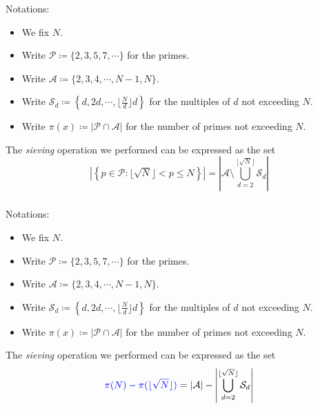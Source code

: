 \begin{frame}\frametitle{\insertsubsection}
Notations:
\begin{itemize}
  \item We fix \(N\).
  \item Write \(\mathcal{P} \coloneqq \{2, 3, 5, 7, \cdots\}\) for the primes.
  \item Write \(\mathcal{A} \coloneqq \{2, 3, 4, \cdots, N - 1, N\}\).
  \item Write \(\mathcal{S}_d \coloneqq \left\{d, 2d, \cdots, \lfloor\frac{N}{d}\rfloor d\right\}\) for the multiples of \(d\) not exceeding \(N\).
  \item Write {\color{blue} \(\pi(x) \coloneqq \left|\mathcal{P} \cap \mathcal{A}\right|\)} for the number of primes not exceeding \(N\).
\end{itemize}

The \textit{sieving} operation we performed can be expressed as the set
\[
  \left|\left\{ p \in \mathcal{P} : \lfloor\sqrt{N}\rfloor < p \leq N \right\}\right|
    = \left|\mathcal{A} \setminus \bigcup_{d = 2}^{\lfloor\sqrt{N}\rfloor} \mathcal{S}_d\right|
\]
\end{frame}

\begin{frame}\frametitle{\insertsubsection}
Notations:
\begin{itemize}
  \item We fix \(N\).
  \item Write \(\mathcal{P} \coloneqq \{2, 3, 5, 7, \cdots\}\) for the primes.
  \item Write \(\mathcal{A} \coloneqq \{2, 3, 4, \cdots, N - 1, N\}\).
  \item Write \(\mathcal{S}_d \coloneqq \left\{d, 2d, \cdots, \lfloor\frac{N}{d}\rfloor d\right\}\) for the multiples of \(d\) not exceeding \(N\).
  \item Write \(\pi(x) \coloneqq \left|\mathcal{P} \cap \mathcal{A}\right|\) for the number of primes not exceeding \(N\).
\end{itemize}

The \textit{sieving} operation we performed can be expressed as the set
\[
  {\color{blue} \pi(N) - \pi(\lfloor\sqrt{N}\rfloor)}
  = |\mathcal{A}| - \left|\bigcup_{d = 2}^{\lfloor\sqrt{N}\rfloor} \mathcal{S}_d\right|
\]
\end{frame}


